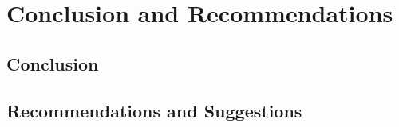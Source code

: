 \chapter{Conclusion and Recommendations}
\section{Conclusion}


\section{Recommendations and Suggestions}
